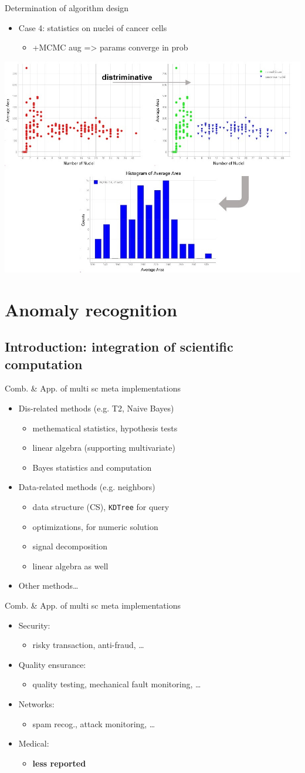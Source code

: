 \documentclass[11pt]{beamer}
\newcommand{\code}[1]{\texttt{#1}}
\newcommand{\asred}[1]{{\color{red}#1}}
\newcommand{\uniitem}[1]{\begin{itemize}\item #1 \end{itemize}}
\begin{document}
\begin{frame}{Determination of algorithm design}
	\uniitem{Case 4: statistics on nuclei of cancer cells
		\uniitem{+MCMC aug => params converge in prob}}
	\centering
	\includegraphics[scale=0.6]{mcmc2.jpg}
\end{frame}

\section{Anomaly recognition}

\subsection{Introduction: integration of scientific computation}

\begin{frame}{Comb. \& App. of multi sc meta implementations}
	\uniitem{Dis-related methods (e.g. T2, Naive Bayes)
		\uniitem{methematical statistics, hypothesis tests}
		\uniitem{linear algebra (supporting multivariate)}
		\uniitem{Bayes statistics and computation}}
	\uniitem{Data-related methods (e.g. neighbors)
		\uniitem{data structure (CS), \code{KDTree} for query}
		\uniitem{optimizations, for numeric solution}
		\uniitem{signal decomposition}
		\uniitem{linear algebra as well}}
	\uniitem{Other methods\dots}
\end{frame}

\begin{frame}{Comb. \& App. of multi sc meta implementations}
	\uniitem{Security:
		\uniitem{risky transaction, anti-fraud, \dots}}
	\uniitem{Quality ensurance:
		\uniitem{quality testing, mechanical fault monitoring, \dots}}
	\uniitem{Networks:
		\uniitem{spam recog., attack monitoring, \dots}}
	\uniitem{Medical:
		\uniitem{\asred{\textbf{less reported}}}}
\end{frame}
\end{document}
